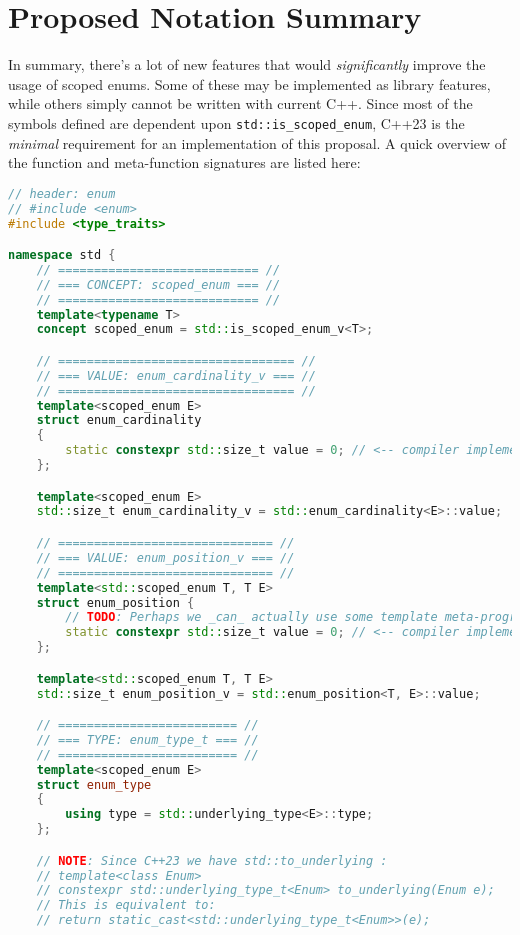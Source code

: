 \documentclass[
  format=manuscript,
  screen=true,
  review=false,
  nonacm=true,
  timestamp=true,
  balance=false]{acmart}
\begin{document}
\section{Proposed Notation Summary}
\label{proposed-notation-summary}

In summary, there's a lot of new features that would \textit{significantly} improve
the usage of scoped enums. Some of these may be implemented as library features,
while others simply cannot be written with current C++. Since most of the symbols
defined are dependent upon \texttt{std::is\_scoped\_enum}, C++23 is the
\textit{minimal} requirement for an implementation of this proposal. A quick overview
of the function and meta-function signatures are listed here:\vspace{2mm}

\begin{lstlisting}[language=Cpp]
// header: enum
// #include <enum>
#include <type_traits>

namespace std {
    // ============================ //
    // === CONCEPT: scoped_enum === //
    // ============================ //
    template<typename T>
    concept scoped_enum = std::is_scoped_enum_v<T>;

    // ================================= //
    // === VALUE: enum_cardinality_v === //
    // ================================= //
    template<scoped_enum E>
    struct enum_cardinality
    {
        static constexpr std::size_t value = 0; // <-- compiler implements this
    };

    template<scoped_enum E>
    std::size_t enum_cardinality_v = std::enum_cardinality<E>::value;

    // ============================== //
    // === VALUE: enum_position_v === //
    // ============================== //
    template<std::scoped_enum T, T E>
    struct enum_position {
        // TODO: Perhaps we _can_ actually use some template meta-programming to do this?
        static constexpr std::size_t value = 0; // <-- compiler implements this
    };

    template<std::scoped_enum T, T E>
    std::size_t enum_position_v = std::enum_position<T, E>::value;

    // ========================= //
    // === TYPE: enum_type_t === //
    // ========================= //
    template<scoped_enum E>
    struct enum_type
    {
        using type = std::underlying_type<E>::type;
    };

    // NOTE: Since C++23 we have std::to_underlying :
    // template<class Enum>
    // constexpr std::underlying_type_t<Enum> to_underlying(Enum e);
    // This is equivalent to:
    // return static_cast<std::underlying_type_t<Enum>>(e);


\end{lstlisting}
\end{document}
